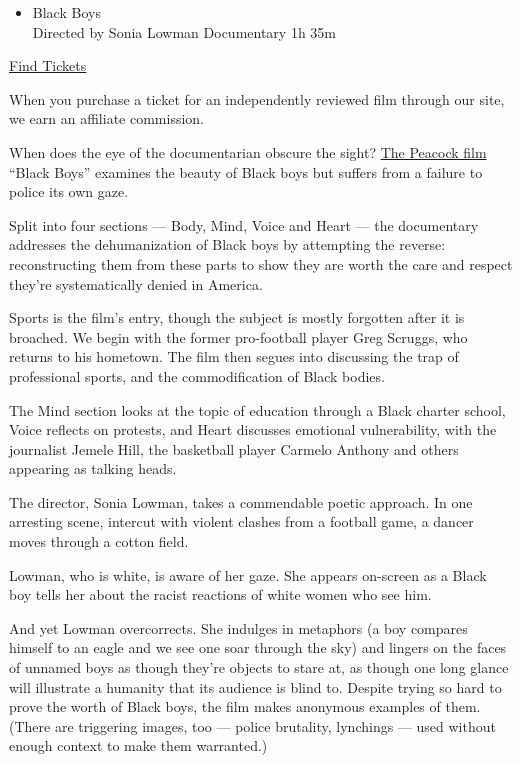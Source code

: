 \begin{itemize}
\tightlist
\item
  Black Boys\\
  Directed by Sonia Lowman Documentary 1h 35m
\end{itemize}

\href{https://www.imdb.com/showtimes/title/tt11473680?ref_=ref_ext_NYT}{Find
Tickets}

When you purchase a ticket for an independently reviewed film through
our site, we earn an affiliate commission.

When does the eye of the documentarian obscure the sight?
\href{https://www.peacocktv.com/watch/asset/movies/documentary/black-boys/0ec3eefe-f60f-3d73-921b-c4307e571a0b}{The
Peacock film} ``Black Boys'' examines the beauty of Black boys but
suffers from a failure to police its own gaze.

Split into four sections --- Body, Mind, Voice and Heart --- the
documentary addresses the dehumanization of Black boys by attempting the
reverse: reconstructing them from these parts to show they are worth the
care and respect they're systematically denied in America.

Sports is the film's entry, though the subject is mostly forgotten after
it is broached. We begin with the former pro-football player Greg
Scruggs, who returns to his hometown. The film then segues into
discussing the trap of professional sports, and the commodification of
Black bodies.

The Mind section looks at the topic of education through a Black charter
school, Voice reflects on protests, and Heart discusses emotional
vulnerability, with the journalist Jemele Hill, the basketball player
Carmelo Anthony and others appearing as talking heads.

The director, Sonia Lowman, takes a commendable poetic approach. In one
arresting scene, intercut with violent clashes from a football game, a
dancer moves through a cotton field.

Lowman, who is white, is aware of her gaze. She appears on-screen as a
Black boy tells her about the racist reactions of white women who see
him.

And yet Lowman overcorrects. She indulges in metaphors (a boy compares
himself to an eagle and we see one soar through the sky) and lingers on
the faces of unnamed boys as though they're objects to stare at, as
though one long glance will illustrate a humanity that its audience is
blind to. Despite trying so hard to prove the worth of Black boys, the
film makes anonymous examples of them. (There are triggering images, too
--- police brutality, lynchings --- used without enough context to make
them warranted.)

